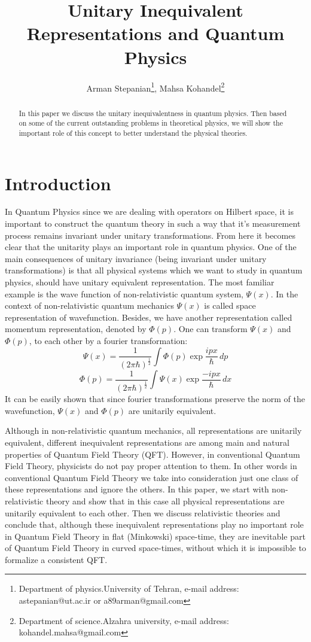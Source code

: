 \documentclass[12pt,a4paper]{article}
\begin{document}
\title{Unitary Inequivalent Representations and Quantum Physics}
\author{Arman Stepanian\thanks{ Department of physics.University of Tehran, e-mail address: astepanian@ut.ac.ir or a89arman@gmail.com}, Mahsa Kohandel\thanks{ Department of science.Alzahra university, 
e-mail address: kohandel.mahsa@gmail.com}
}

\maketitle
\begin{abstract}
In this paper we discuss the unitary inequivalentness in quantum physics. Then based on some of the current outstanding problems in theoretical physics, we will show the important role of this concept to better understand the physical theories. 
\end{abstract}
\section{Introduction}\label{section.intro}
In Quantum Physics since we are dealing with operators on Hilbert space, it is important to construct the quantum theory in such a way that it's measurement process remains invariant under unitary transformations. From here it becomes clear that the unitarity plays an important role in quantum physics. One of the main consequences of unitary invariance (being invariant under unitary transformations) is that all physical systems which we want to study in quantum physics, should have unitary equivalent representation. The most familiar example is the wave function of non-relativistic quantum system, $\Psi(x)$. In the context of non-relativistic quantum mechanics $\Psi(x)$ is called space representation of wavefunction. Besides, we have another representation called momentum representation, denoted by $\Phi(p)$. One can transform $\Psi(x)$ and $\Phi(p)$, to each other by a fourier transformation:
\begin{equation}\label{eqn.fourier trans.1}
   \Psi(x)= \frac{1}{(2\pi\hbar)^\frac{1}{2}}\int \Phi (p)\exp \frac{ipx}{\hbar}\,dp
\end{equation}
$$
      \Phi(p)=\frac{1}{(2\pi\hbar)^\frac{1}{2}}\int \Psi(x) \exp \frac{-ipx}{\hbar}\,dx
$$
It can be easily shown that since fourier transformations preserve the norm of the wavefunction, $\Psi(x)$ and $\Phi(p)$ are unitarily equivalent.

Although in non-relativistic quantum mechanics, all representations are unitarily equivalent, different inequivalent representations are among main and natural properties of Quantum Field Theory (QFT). However, in conventional Quantum Field Theory, physicists do not pay proper attention to them. In other words in conventional Quantum Field Theory we take into consideration just one class of these representations and ignore the others. In this paper, we start with non-relativistic theory and show that in this case all physical representations are unitarily equivalent to each other. Then we discuss relativistic theories and conclude that, although these inequivalent representations play no important role in Quantum Field Theory in flat (Minkowski) space-time, they are inevitable part of Quantum Field Theory in curved space-times, without which it is impossible to formalize a consistent QFT.
\end{document}
